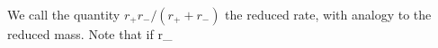 We call the quantity \(r_+r_-/(r_++r_-)\) the reduced rate, with analogy to the reduced mass.  Note that if r_